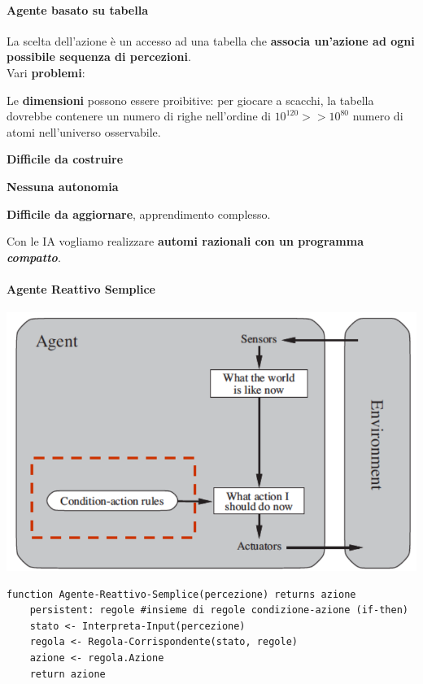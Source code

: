\documentclass[10pt]{book}
\begin{document}
\paragraph{Agente basato su tabella} La scelta dell'azione è un accesso ad una tabella che \textbf{associa un'azione ad ogni possibile sequenza di percezioni}.\\
Vari \textbf{problemi}:
\begin{list}{}{}
	\item Le \textbf{dimensioni} possono essere proibitive: per giocare a scacchi, la tabella dovrebbe contenere un numero di righe nell'ordine di $10^{120} >> 10^{80}$ numero di atomi nell'universo osservabile.
	\item \textbf{Difficile da costruire}
	\item \textbf{Nessuna autonomia}
	\item \textbf{Difficile da aggiornare}, apprendimento complesso.
\end{list}
Con le IA vogliamo realizzare \textbf{automi razionali con un programma \textit{compatto}}.
\pagebreak
\paragraph{Agente Reattivo Semplice}
\begin{center}
	\includegraphics[scale=0.5]{agreattsemplice.png}
\end{center}
\begin{lstlisting}
function Agente-Reattivo-Semplice(percezione) returns azione
	persistent: regole #insieme di regole condizione-azione (if-then)
	stato <- Interpreta-Input(percezione)
	regola <- Regola-Corrispondente(stato, regole)
	azione <- regola.Azione
	return azione
\end{lstlisting}
\end{document}
